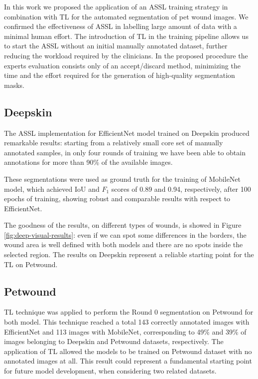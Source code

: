 \documentclass[../main.tex]{subfiles}
\begin{document}
In this work we proposed the application of an ASSL training strategy in combination with TL for the automated segmentation of pet wound images. We confirmed the effectiveness of ASSL in labelling large amount of data with a minimal human effort. 
The introduction of TL in the training pipeline allows us to start the ASSL without an initial manually annotated dataset, further reducing the workload required by the clinicians. 
In the proposed procedure the experts evaluation consists only of an accept/discard method, minimizing the time and the effort required for the generation of high-quality segmentation masks.

\subsection{Deepskin}

The ASSL implementation for EfficientNet model trained on Deepskin produced remarkable results: starting from a relatively small core set of manually annotated samples, in only four rounds of training we have been able to obtain annotations for more than 90\% of the available images. 

These segmentations were used as ground truth for the training of MobileNet model, which achieved IoU and $F_1$ scores of 0.89 and 0.94, respectively, after 100 epochs of training, showing robust and comparable results with respect to EfficientNet.

The goodness of the results, on different types of wounds, is showed in Figure \ref{fig:deep-visual-results}: even if we can spot some differences in the borders, the wound area is well defined with both models and there are no spots inside the selected region.
The results on Deepskin represent a reliable starting point for the TL on Petwound.

\subsection{Petwound}

TL technique was applied to perform the Round 0 segmentation on Petwound for both model. 
This technique reached a total 143 correctly annotated images with EfficientNet and 113 images with MobileNet, corresponding to 49\% and 39\% of images belonging to Deepskin and Petwound datasets, respectively. 
The application of TL allowed the models to be trained on Petwound dataset with no annotated images at all.
This result could represent a fundamental starting point for future model development, when considering two related datasets.
\end{document}
